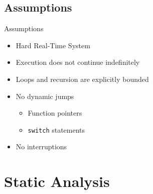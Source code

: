 \documentclass{beamer}
\begin{document}
\subsection{Assumptions}

\begin{frame}{Assumptions}
  \pause
  \begin{itemize}
    \item Hard Real-Time System
    \item Execution does not continue indefinitely
    \item Loops and recursion are explicitly bounded \pause
    \item No dynamic jumps
      \begin{itemize}
        \item Function pointers
        \item \texttt{switch} statements
      \end{itemize}
      \pause
    \item No interruptions
  \end{itemize}
\end{frame}

\section{Static Analysis}
\end{document}
